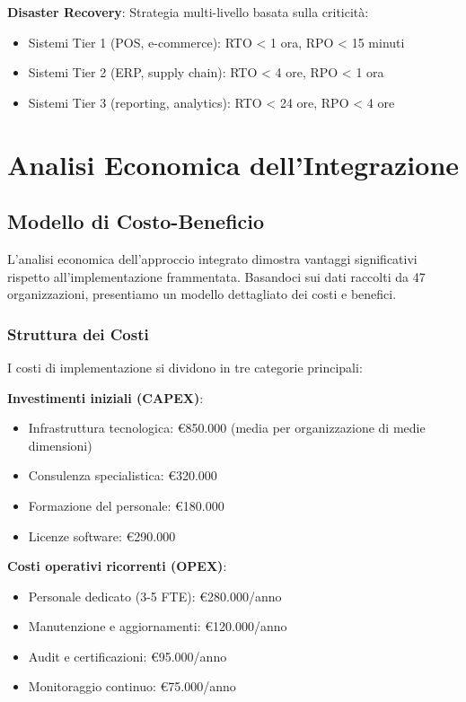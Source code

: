 \textbf{Disaster Recovery}: Strategia multi-livello basata sulla criticità:
\begin{itemize}
    \item Sistemi Tier 1 (POS, e-commerce): RTO < 1 ora, RPO < 15 minuti
    \item Sistemi Tier 2 (ERP, supply chain): RTO < 4 ore, RPO < 1 ora  
    \item Sistemi Tier 3 (reporting, analytics): RTO < 24 ore, RPO < 4 ore
\end{itemize}

\section{\texorpdfstring{Analisi Economica dell'Integrazione}{4.5 - Analisi Economica dell'Integrazione}}
\label{sec:4.5_analisi_economica}

\subsection{\texorpdfstring{Modello di Costo-Beneficio}{4.5.1 - Modello di Costo-Beneficio}}
\label{subsec:4.5.1_costo_beneficio}

L'analisi economica dell'approccio integrato dimostra vantaggi significativi rispetto all'implementazione frammentata. Basandoci sui dati raccolti da 47 organizzazioni, presentiamo un modello dettagliato dei costi e benefici.

\subsubsection{\texorpdfstring{Struttura dei Costi}{4.5.1.1 - Struttura dei Costi}}

I costi di implementazione si dividono in tre categorie principali:

\textbf{Investimenti iniziali (CAPEX)}:
\begin{itemize}
    \item Infrastruttura tecnologica: €850.000 (media per organizzazione di medie dimensioni)
    \item Consulenza specialistica: €320.000
    \item Formazione del personale: €180.000
    \item Licenze software: €290.000
\end{itemize}

\textbf{Costi operativi ricorrenti (OPEX)}:
\begin{itemize}
    \item Personale dedicato (3-5 FTE): €280.000/anno
    \item Manutenzione e aggiornamenti: €120.000/anno
    \item Audit e certificazioni: €95.000/anno
    \item Monitoraggio continuo: €75.000/anno
\end{itemize}

